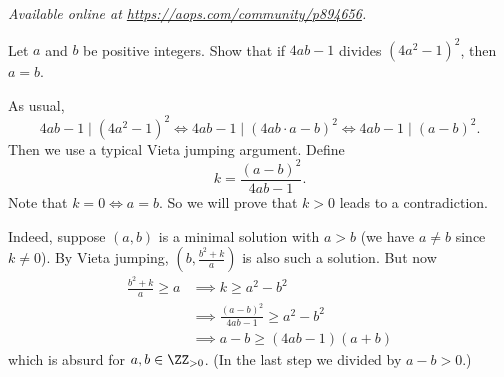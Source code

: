 \textsl{Available online at \url{https://aops.com/community/p894656}.}
\begin{mdframed}[style=mdpurplebox,frametitle={Problem statement}]
Let $a$ and $b$ be positive integers.
Show that if $4ab - 1$ divides $(4a^{2} - 1)^{2}$, then $a = b$.
\end{mdframed}
As usual,
\[ 4ab-1 \mid (4a^2-1)^2 \iff 4ab-1 \mid (4ab \cdot a-b)^2
  \iff 4ab-1 \mid (a-b)^2. \]
Then we use a typical Vieta jumping argument.
Define \[ k = \frac{(a-b)^2}{4ab-1}. \]
Note that $k = 0 \iff a = b$.
So we will prove that $k > 0$ leads to a contradiction.

Indeed, suppose $(a, b)$ is a minimal solution with $a > b$
(we have $a \neq b$ since $k \neq 0$).
By Vieta jumping, $(b, \frac{b^2+k}{a})$ is also such a solution.
But now
\begin{align*}
  \frac{b^2+k}{a} \ge a &\implies k \ge a^2 - b^2 \\
  &\implies \frac{(a-b)^2}{4ab-1} \ge a^2-b^2 \\
  &\implies a-b \ge (4ab-1)(a+b)
\end{align*}
which is absurd for $a,b \in \ZZ_{>0}$.
(In the last step we divided by $a-b > 0$.)
\pagebreak